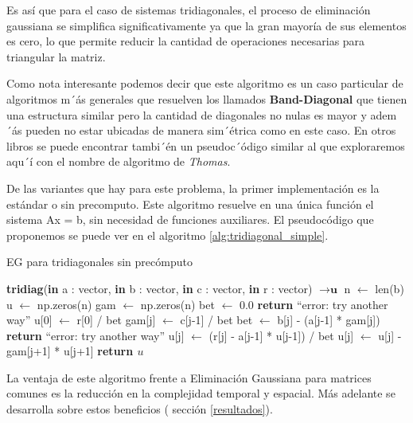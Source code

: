  Es así que para el caso de sistemas tridiagonales, el proceso de eliminación gaussiana se simplifica significativamente ya que la gran mayoría de sus elementos es cero, lo que permite reducir la cantidad de operaciones necesarias para triangular la matriz.
 
 Como nota interesante podemos decir que este algoritmo es un caso particular de algoritmos m´ás generales que resuelven los llamados \textbf{Band-Diagonal} \cite{Recipes07-Band} que tienen una estructura similar pero la cantidad de diagonales no nulas es mayor y adem´ás pueden no estar ubicadas de manera sim´étrica como en este caso. En otros libros se puede encontrar tambi´én un pseudoc´ódigo similar al que exploraremos aqu´í con el nombre de algoritmo de \textit{Thomas}. 


 De las variantes que hay para este problema, la primer implementación es la estándar o sin precomputo. Este algoritmo resuelve en una única función el sistema Ax = b, sin necesidad de funciones auxiliares. El pseudocódigo que proponemos se puede ver en el algoritmo \ref{alg:tridiagonal_simple}.

 \begin{algorithm}
 
\caption{EG para tridiagonales sin precómputo}\label{alg:tridiagonal_simple}
\begin{algorithmic}[1]
\State \textbf{tridiag}(\textbf{in} a : vector, \textbf{in} b : vector, \textbf{in} c : vector, \textbf{in} r : vector) $\to \textbf{u}$
\State n $\gets$ len(b)
\State u $\gets$ np.zeros(n)
\State gam $\gets$ np.zeros(n)
\State bet $\gets$ 0.0
    \State \textbf{return} ``error: try another way''
\EndIf
\State u[0] $\gets$ r[0] / bet
    \State gam[j] $\gets$ c[j-1] / bet
    \State bet $\gets$ b[j] - (a[j-1] * gam[j])
        \State \textbf{return} ``error: try another way''
    \EndIf
    \State u[j] $\gets$ (r[j] - a[j-1] * u[j-1]) / bet
\EndFor
{}
    \State u[j] $\gets$ u[j] - gam[j+1] * u[j+1]
\EndFor
\State \textbf{return $u$}
\end{algorithmic}
\end{algorithm}

La ventaja de este algoritmo frente a Eliminación Gaussiana para matrices comunes es la reducción en la complejidad temporal y espacial. Más adelante se desarrolla sobre estos beneficios ( sección \ref{resultados}).



